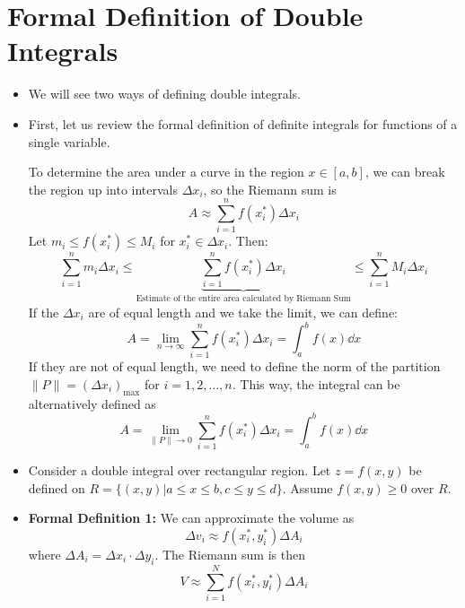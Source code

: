 \section{Formal Definition of Double Integrals}
\begin{itemize}
    \item We will see two ways of defining double integrals.
    \item First, let us review the formal definition of definite integrals for functions of a single variable.
    
    To determine the area under a curve in the region $x\in [a,b]$, we can break the region up into intervals $\Delta x_i$, so the Riemann sum is
    \begin{equation}
        A \approx \sum_{i=1}^n f(x_i^*)\Delta x_i
    \end{equation}
    Let $m_i \le f(x_i^*) \le M_i$ for $x_i^* \in \Delta x_i$. Then: 
    \begin{equation}
        \sum_{i=1}^n m_i \Delta x_i \le \underbrace{\sum_{i=1}^n f(x_i^*)\Delta x_i}_\text{Estimate of the entire area calculated by Riemann Sum} \le \sum_{i=1}^n M_i \Delta x_i
    \end{equation}
    If the $\Delta x_i$ are of equal length and we take the limit, we can define: 
    \begin{equation}
        A = \lim_{n\to\infty} \sum_{i=1}^n f(x_i^*)\Delta x_i = \int_a^b f(x) \dd{x}
    \end{equation}
    If they are not of equal length, we need to define the norm of the partition $\lVert P \rVert = (\Delta x_i)_\text{max}$ for $i=1,2,\dots,n$. This way, the integral can be alternatively defined as 
    \begin{equation}
        A = \lim_{\lVert P \rVert \rightarrow 0} \sum_{i=1}^n f(x_i^*)\Delta x_i = \int_a^b f(x) \dd{x}
    \end{equation}
    \item Consider a double integral over rectangular region. Let $z=f(x,y)$ be defined on $R=\{(x,y)|a\le x\le b, c\le y \le d\}$. Assume $f(x,y) \ge 0$ over $R$.
    \item \textbf{Formal Definition 1:} We can approximate the volume as
    \begin{equation}
        \Delta v_i \approx f(x_i^*,y_i^*)\Delta A_i
    \end{equation}
    where $\Delta A_i = \Delta x_i \cdot \Delta y_i$. The Riemann sum is then 
    \begin{equation}
        V \approx \sum_{i=1}^N f(x_i^*,y_i^*)\Delta A_i

\end{equation}
\end{itemize}
